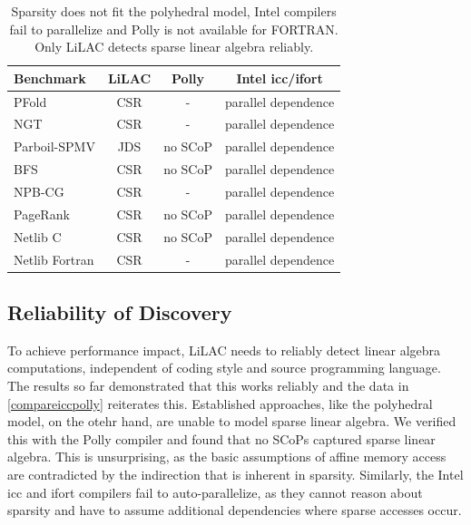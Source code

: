 \begin{table}[b]
\centering
\caption{Sparsity does not fit the polyhedral model, Intel compilers fail to
         parallelize and Polly is not available for FORTRAN.
         Only LiLAC detects sparse linear algebra reliably.}
\label{compareiccpolly}
\vspace{-0.5em}
\small
\begin{tabular}{l|c|c|c}
{\bf Benchmark}      & {\bf LiLAC}    & {\bf Polly}   & {\bf Intel icc/ifort} \\
\hline
\hline
PFold          & CSR & - & parallel dependence \\[-0.3em]
NGT            & CSR & - & parallel dependence \\[-0.3em]
Parboil-SPMV   & JDS & no SCoP & parallel dependence \\[-0.3em]
BFS            & CSR & no SCoP & parallel dependence \\[-0.3em]
NPB-CG         & CSR & - & parallel dependence \\[-0.3em]
PageRank       & CSR & no SCoP & parallel dependence \\[-0.3em]
Netlib C       & CSR & no SCoP & parallel dependence \\[-0.3em]
Netlib Fortran & CSR & - & parallel dependence \\
\end{tabular}
\end{table}

\subsection{Reliability of Discovery}

    To achieve performance impact, LiLAC needs to reliably detect linear algebra
    computations, independent of coding style and source programming language.
    The results so far demonstrated that this works reliably and the data in
    \autoref{compareiccpolly} reiterates this.
    Established approaches, like the polyhedral model, on the otehr hand, are
    unable to model sparse linear algebra.
    We verified this with the Polly compiler and found that no SCoPs captured
    sparse linear algebra.
    This is unsurprising, as the basic assumptions of affine memory access are
    contradicted by the indirection that is inherent in sparsity.
    Similarly, the Intel icc and ifort compilers fail to auto-parallelize, as
    they cannot reason about sparsity and have to assume additional dependencies
    where sparse accesses occur.


